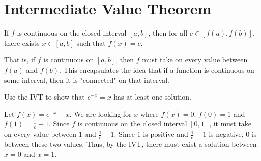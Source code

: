 \section{Intermediate Value Theorem}
\begin{theorem}
	If $f$ is continuous on the closed interval $[a,b]$, then for all $c \in [f(a), f(b)]$, there exists $x \in [a,b]$ such that $f(x) = c$.
\end{theorem}
\noindent
That is, if $f$ is continuous on $[a,b]$, then $f$ must take on every value between $f(a)$ and $f(b)$.
This encapsulates the idea that if a function is continuous on some interval, then it is "connected" on that interval.

\begin{example}
	Use the IVT to show that $e^{-x} = x$ has at least one solution.
\end{example}
Let $f(x) = e^{-x} - x$.
We are looking for $x$ where $f(x) = 0$.
$f(0) = 1$ and $f(1) = \frac{1}{e} - 1$.
Since $f$ is continuous on the closed interval $[0,1]$, it must take on every value between $1$ and $\frac{1}{e} - 1$.
Since $1$ is positive and $\frac{1}{e} - 1$ is negative, 0 is between these two values.
Thus, by the IVT, there must exist a solution between $x=0$ and $x=1$.